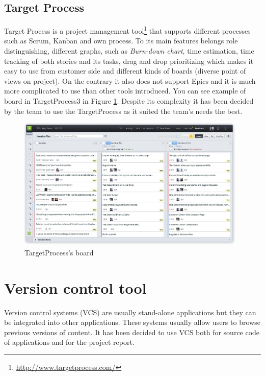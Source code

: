 \subsection{Target Process} 
\label{subsec:targetProcessToolDescription}
Target Process is a project management tool\footnote{\url{http://www.targetprocess.com/}} that supports different processes such as Scrum, Kanban and own process. 
To its main features belongs role distinguishing, different graphs, such as \emph{Burn-down chart}, time estimation, time tracking of both stories and its tasks, drag and drop prioritizing which makes it easy to use from customer side and different kinds of boards (diverse point of views on project).
On the contrary it also does not support Epics and it is much more complicated to use than other tools introduced.
You can see example of board in TargetProcess3 in Figure \ref{fig:targetp}. Despite its complexity it has been decided by the team to use the TargetProcess as it suited the team's needs the best.

\begin{figure}[!t]
	\centering
		\includegraphics[width=11cm]{preliminaryStudies/targetp.png}
	\caption{TargetProcess's board}
	\label{fig:targetp}
\end{figure}


\section{Version control tool}
\label{sec:vcs}
Version control systems (VCS) are usually stand-alone applications but they can be integrated into other applications. These systems usually allow users to browse previous versions of content. It has been decided to use VCS both for source code of applications and for the project report. 


